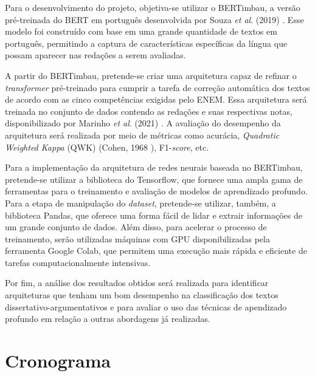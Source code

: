 \documentclass{article}
\begin{document}
Para o desenvolvimento do projeto, objetiva-se utilizar o BERTimbau, a versão
pré-treinada do BERT em português desenvolvida por Souza \textit{et al}. (2019)
\cite{BERTimbau}. Esse modelo foi construído com base em uma grande quantidade
de textos em português, permitindo a captura de características específicas da
língua que possam aparecer nas redações a serem avaliadas.

A partir do BERTimbau, pretende-se criar uma arquitetura capaz de refinar o
\textit{transformer} pré-treinado para cumprir a tarefa de correção automática
dos textos de acordo com as cinco competências exigidas pelo ENEM. Essa
arquitetura será treinada no conjunto de dados contendo as redações e suas
respectivas notas, disponibilizado por Marinho \textit{et al}. (2021)
\cite{Dataset}. A avaliação do desempenho da arquitetura será realizada por meio
de métricas como acurácia, \textit{Quadratic Weighted Kappa} (QWK) (Cohen, 1968
\cite{QWK}), F1-\textit{score}, etc.

Para a implementação da arquitetura de redes neurais baseada no BERTimbau,
pretende-se utilizar a biblioteca do Tensorflow, que fornece uma ampla gama de
ferramentas para o treinamento e avaliação de modelos de aprendizado profundo.
Para a etapa de  manipulação do \textit{dataset}, pretende-se utilizar, também,
a biblioteca Pandas, que oferece uma forma fácil de lidar e extrair informações
de um grande conjunto de dados. Além disso, para acelerar o processo de
treinamento, serão utilizadas máquinas com GPU disponibilizadas pela ferramenta
Google Colab, que permitem uma execução mais rápida e eficiente de tarefas
computacionalmente intensivas.

Por fim, a análise dos resultados obtidos será realizada para identificar
arquiteturas que tenham um bom desempenho na classificação dos textos
dissertativo-argumentativos e para avaliar o uso das técnicas de apendizado
profundo em relação a outras abordagens já realizadas.

\section{Cronograma}
\end{document}
